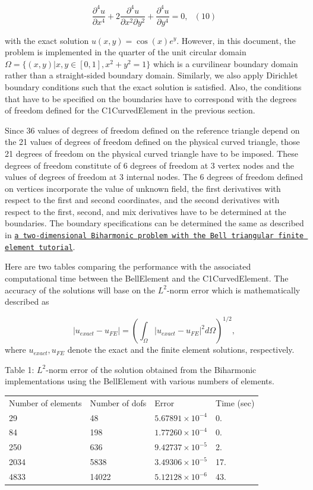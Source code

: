 \[ \frac{\partial^4 u}{\partial x^4} + 2\frac{\partial^4 u}{\partial x^2\partial y^2} + \frac{\partial^4 u}{\partial y^4} = 0, \ \ \ (10) \]

with the exact solution $ u(x,y) = \cos(x)e^y.$ However, in this document, the problem is implemented in the quarter of the unit circular domain $ \Omega = \{(x,y) | x,y \in [0,1] , x^2+y^2 = 1\} $ which is a curvilinear boundary domain rather than a straight-\/sided boundary domain. Similarly, we also apply Dirichlet boundary conditions such that the exact solution is satisfied. Also, the conditions that have to be specified on the boundaries have to correspond with the degrees of freedom defined for the {\ttfamily C1\+Curved\+Element} in the previous section.

Since 36 values of degrees of freedom defined on the reference triangle depend on the 21 values of degrees of freedom defined on the physical curved triangle, those 21 degrees of freedom on the physical curved triangle have to be imposed. These degrees of freedom constitute of 6 degrees of freedom at 3 vertex nodes and the values of degrees of freedom at 3 internal nodes. The 6 degrees of freedom defined on vertices incorporate the value of unknown field, the first derivatives with respect to the first and second coordinates, and the second derivatives with respect to the first, second, and mix derivatives have to be determined at the boundaries. The boundary specifications can be determined the same as described in \href{../../../c1_element/bell_element/html/index.html}{\tt a two-\/dimensional Biharmonic problem with the Bell triangular finite element tutorial}.

Here are two tables comparing the performance with the associated computational time between the {\ttfamily Bell\+Element} and the {\ttfamily C1\+Curved\+Element}. The accuracy of the solutions will base on the $ L^2 $-\/norm error which is mathematically described as

\[ |u_{exact}-u_{FE}| = \left( \int_{\Omega} | u_{exact} - u_{FE}|^2 d\Omega \right)^{1/2}, \] where $ u_{exact},u_{FE} $ denote the exact and the finite element solutions, respectively.

Table 1\+: $L^2$-\/norm error of the solution obtained from the Biharmonic implementations using the Bell\+Element with various numbers of elements.

\begin{center} \tabulinesep=1mm
\begin{longtabu} spread 0pt [c]{*{4}{|X[-1]}|}
\hline
Number of elements  &Number of dofs  &Error  &Time (sec)   \\
29  &48  &$ 5.67891 \times 10^{-4} $  &0.   \\
84  &198  &$ 1.77260 \times 10^{-4} $  &0.   \\
250  &636  &$ 9.42737 \times 10^{-5} $  &2.   \\
2034  &5838  &$ 3.49306 \times 10^{-5} $  &17.   \\
4833  &14022  &$ 5.12128 \times 10^{-6} $  &43.     \\
\end{longtabu}
\end{center} 

